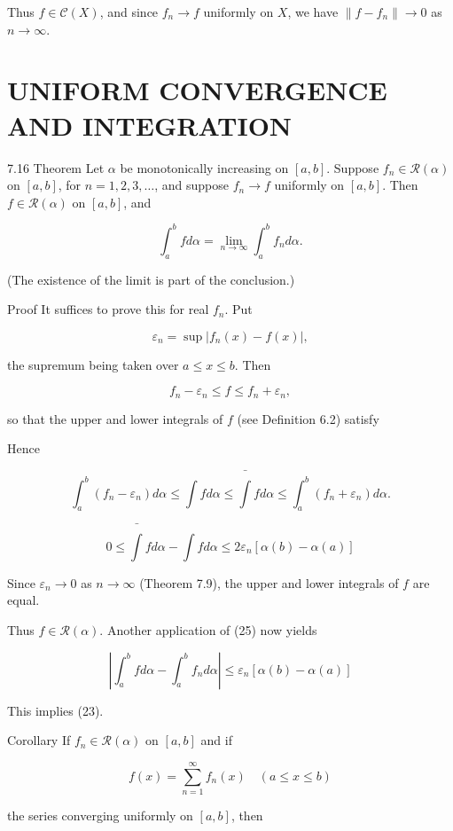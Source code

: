 \documentclass[10pt]{article}
\begin{document}
Thus $f \in \mathscr{C}(X)$, and since $f_{n} \rightarrow f$ uniformly on $X$, we have $\left\|f-f_{n}\right\| \rightarrow 0$ as $n \rightarrow \infty$.

\section{UNIFORM CONVERGENCE AND INTEGRATION}
7.16 Theorem Let $\alpha$ be monotonically increasing on $[a, b]$. Suppose $f_{n} \in \mathscr{R}(\alpha)$ on $[a, b]$, for $n=1,2,3, \ldots$, and suppose $f_{n} \rightarrow f$ uniformly on $[a, b]$. Then $f \in \mathscr{R}(\alpha)$ on $[a, b]$, and

$$
\int_{a}^{b} f d \alpha=\lim _{n \rightarrow \infty} \int_{a}^{b} f_{n} d \alpha .
$$

(The existence of the limit is part of the conclusion.)

Proof It suffices to prove this for real $f_{n}$. Put

$$
\varepsilon_{n}=\sup \left|f_{n}(x)-f(x)\right|,
$$

the supremum being taken over $a \leq x \leq b$. Then

$$
f_{n}-\varepsilon_{n} \leq f \leq f_{n}+\varepsilon_{n},
$$

so that the upper and lower integrals of $f$ (see Definition 6.2) satisfy

Hence

$$
\int_{a}^{b}\left(f_{n}-\varepsilon_{n}\right) d \alpha \leq \int f d \alpha \leq \bar{\int} f d \alpha \leq \int_{a}^{b}\left(f_{n}+\varepsilon_{n}\right) d \alpha .
$$

$$
0 \leq \bar{\int} f d \alpha-\int f d \alpha \leq 2 \varepsilon_{n}[\alpha(b)-\alpha(a)]
$$

Since $\varepsilon_{n} \rightarrow 0$ as $n \rightarrow \infty$ (Theorem 7.9), the upper and lower integrals of $f$ are equal.

Thus $f \in \mathscr{R}(\alpha)$. Another application of (25) now yields

$$
\left|\int_{a}^{b} f d \alpha-\int_{a}^{b} f_{n} d \alpha\right| \leq \varepsilon_{n}[\alpha(b)-\alpha(a)]
$$

This implies (23).

Corollary If $f_{n} \in \mathscr{R}(\alpha)$ on $[a, b]$ and if

$$
f(x)=\sum_{n=1}^{\infty} f_{n}(x) \quad(a \leq x \leq b)
$$

the series converging uniformly on $[a, b]$, then
\end{document}
